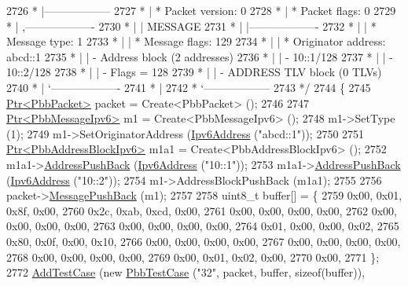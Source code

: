 \begin{DoxyCode}
2726 \textcolor{comment}{         * |------------------}
2727 \textcolor{comment}{         * | * Packet version:    0}
2728 \textcolor{comment}{         * | * Packet flags:  0}
2729 \textcolor{comment}{         * |    ,-------------------}
2730 \textcolor{comment}{         * |    |  MESSAGE}
2731 \textcolor{comment}{         * |    |-------------------}
2732 \textcolor{comment}{         * |    | * Message type:       1}
2733 \textcolor{comment}{         * |    | * Message flags:  129}
2734 \textcolor{comment}{         * |    | * Originator address: abcd::1}
2735 \textcolor{comment}{         * |    | - Address block (2 addresses)}
2736 \textcolor{comment}{         * |    |     - 10::1/128}
2737 \textcolor{comment}{         * |    |     - 10::2/128}
2738 \textcolor{comment}{         * |    |     - Flags = 128}
2739 \textcolor{comment}{         * |    | - ADDRESS TLV block (0 TLVs)}
2740 \textcolor{comment}{         * |    `-------------------}
2741 \textcolor{comment}{         * |}
2742 \textcolor{comment}{         * `------------------}
2743 \textcolor{comment}{   */}
2744   \{
2745     \hyperlink{classns3_1_1Ptr}{Ptr<PbbPacket>} packet = Create<PbbPacket> ();
2746 
2747     \hyperlink{classns3_1_1Ptr}{Ptr<PbbMessageIpv6>} m1 = Create<PbbMessageIpv6> ();
2748     m1->SetType (1);
2749     m1->SetOriginatorAddress (\hyperlink{classns3_1_1Ipv6Address}{Ipv6Address} (\textcolor{stringliteral}{"abcd::1"}));
2750 
2751     \hyperlink{classns3_1_1Ptr}{Ptr<PbbAddressBlockIpv6>} m1a1 = Create<PbbAddressBlockIpv6> ();
2752     m1a1->\hyperlink{classns3_1_1PbbAddressBlock_a7be545a53d69bd426dbebcf752ed8371}{AddressPushBack} (\hyperlink{classns3_1_1Ipv6Address}{Ipv6Address} (\textcolor{stringliteral}{"10::1"}));
2753     m1a1->\hyperlink{classns3_1_1PbbAddressBlock_a7be545a53d69bd426dbebcf752ed8371}{AddressPushBack} (\hyperlink{classns3_1_1Ipv6Address}{Ipv6Address} (\textcolor{stringliteral}{"10::2"}));
2754     m1->AddressBlockPushBack (m1a1);
2755 
2756     packet->\hyperlink{classns3_1_1PbbPacket_a4a3170001ef758d9c9c4375b8f089826}{MessagePushBack} (m1);
2757 
2758     uint8\_t buffer[] = \{
2759       0x00, 0x01, 0x8f, 0x00,
2760       0x2c, 0xab, 0xcd, 0x00,
2761       0x00, 0x00, 0x00, 0x00,
2762       0x00, 0x00, 0x00, 0x00,
2763       0x00, 0x00, 0x00, 0x00,
2764       0x01, 0x00, 0x00, 0x02,
2765       0x80, 0x0f, 0x00, 0x10,
2766       0x00, 0x00, 0x00, 0x00,
2767       0x00, 0x00, 0x00, 0x00,
2768       0x00, 0x00, 0x00, 0x00,
2769       0x00, 0x01, 0x02, 0x00,
2770       0x00,
2771     \};
2772     \hyperlink{classns3_1_1TestCase_a3718088e3eefd5d6454569d2e0ddd835}{AddTestCase} (\textcolor{keyword}{new} \hyperlink{classPbbTestCase}{PbbTestCase} (\textcolor{stringliteral}{"32"}, packet, buffer, \textcolor{keyword}{sizeof}(buffer)), 

\end{DoxyCode}
